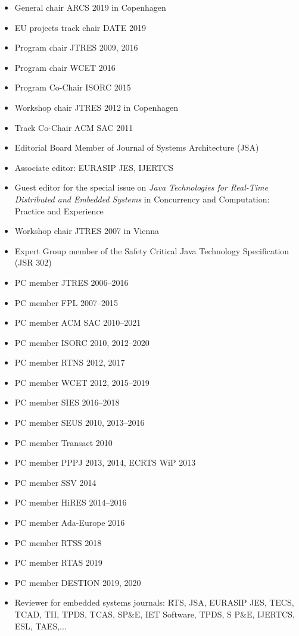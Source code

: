 \documentclass[%
    a4paper,
    11pt, %
    headinclude, footexclude,
    notitlepage,
    headsepline,
    pointlessnumbers,
    ]{scrartcl}
\begin{document}
\begin{itemize}
  \item General chair ARCS 2019 in Copenhagen
  \item EU projects track chair DATE 2019
  \item Program chair JTRES 2009, 2016
  \item Program chair WCET 2016
  \item Program Co-Chair ISORC 2015
  \item Workshop chair JTRES 2012 in Copenhagen
  \item Track Co-Chair ACM SAC 2011
  \item Editorial Board Member of Journal of Systems Architecture (JSA)
  \item Associate editor: EURASIP JES, IJERTCS
  \item Guest editor for the special issue on \emph{Java
      Technologies for Real-Time Distributed and Embedded
      Systems} in Concurrency and Computation: Practice and
      Experience
  \item Workshop chair JTRES 2007 in Vienna
  \item Expert Group member of the Safety Critical Java
      Technology Specification (JSR 302)
  \item PC member JTRES 2006--2016
  \item PC member FPL 2007--2015
  \item PC member ACM SAC 2010--2021
  \item PC member ISORC 2010, 2012--2020
  \item PC member RTNS 2012, 2017
  \item PC member WCET 2012, 2015--2019
  \item PC member SIES 2016--2018
  \item PC member SEUS 2010, 2013--2016
  \item PC member Transact 2010
  \item PC member PPPJ 2013, 2014, ECRTS WiP 2013
  \item PC member SSV 2014
  \item PC member HiRES 2014--2016
  \item PC member Ada-Europe 2016
  \item PC member RTSS 2018
  \item PC member RTAS 2019
  \item PC member DESTION 2019, 2020
  \item Reviewer for embedded systems journals: RTS, JSA, EURASIP JES,
      TECS, TCAD, TII, TPDS, TCAS, SP\&E, IET Software, TPDS, S P\&E, IJERTCS, ESL, TAES,...
\end{itemize}
\end{document}
